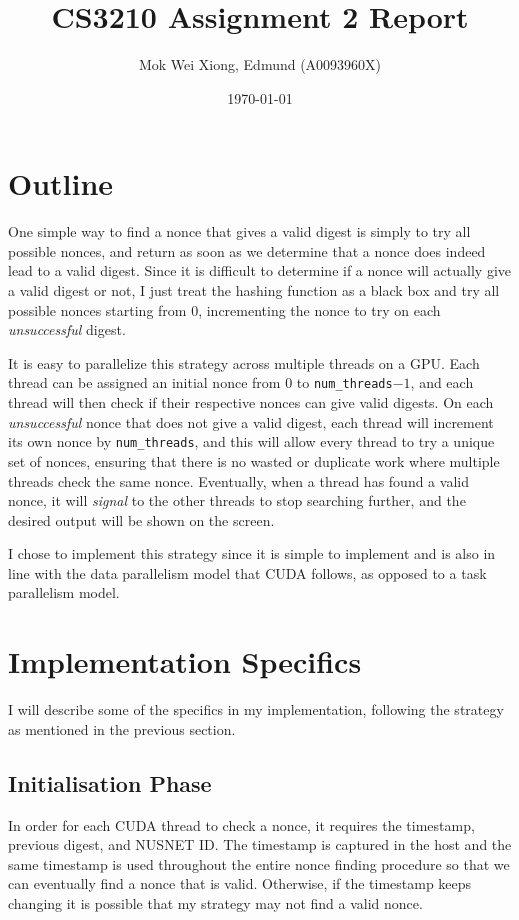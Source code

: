 \documentclass[12pt]{article}
\title{CS3210 Assignment 2 Report}
\date{\today}
\author{Mok Wei Xiong, Edmund (A0093960X)}
\begin{document}
\maketitle

\section{Outline}

One simple way to find a nonce that gives a valid digest is simply to try all possible nonces, and return as soon as we determine that a nonce does indeed lead to a valid digest. Since it is difficult to determine if a nonce will actually give a valid digest or not, I just treat the hashing function as a black box and try all possible nonces starting from 0, incrementing the nonce to try on each \textit{unsuccessful} digest.

\bigbreak \noindent It is easy to parallelize this strategy across multiple threads on a GPU. Each thread can be assigned an initial nonce from $0$ to \verb!num_threads!$- 1$, and each thread will then check if their respective nonces can give valid digests. On each \textit{unsuccessful} nonce that does not give a valid digest, each thread will increment its own nonce by \verb!num_threads!, and this will allow every thread to try a unique set of nonces, ensuring that there is no wasted or duplicate work where multiple threads check the same nonce. Eventually, when a thread has found a valid nonce, it will \textit{signal} to the other threads to stop searching further, and the desired output will be shown on the screen.

\bigbreak \noindent I chose to implement this strategy since it is simple to implement and is also in line with the data parallelism model that CUDA follows, as opposed to a task parallelism model. 

\section{Implementation Specifics}

I will describe some of the specifics in my implementation, following the strategy as mentioned in the previous section.

\subsection{Initialisation Phase}

In order for each CUDA thread to check a nonce, it requires the timestamp, previous digest, and NUSNET ID. The timestamp is captured in the host and the same timestamp is used throughout the entire nonce finding procedure so that we can eventually find a nonce that is valid. Otherwise, if the timestamp keeps changing it is possible that my strategy may not find a valid nonce.
\end{document}
